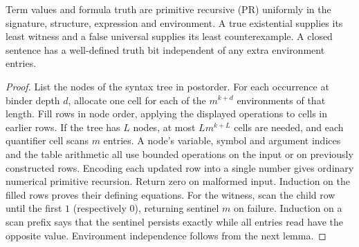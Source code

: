 \begin{proposition}\label{prop:mc}
Term values and formula truth are primitive recursive (PR) uniformly in the signature, structure, expression and environment. A true existential supplies its least witness and a false universal supplies its least counterexample. A closed sentence has a well-defined truth bit independent of any extra environment entries.
\end{proposition}
\begin{proof}
List the nodes of the syntax tree in postorder. For each occurrence at binder depth $d$, allocate one cell for each of the $m^{k+d}$ environments of that length. Fill rows in node order, applying the displayed operations to cells in earlier rows. If the tree has $L$ nodes, at most $L m^{k+L}$ cells are needed, and each quantifier cell scans $m$ entries. A node's variable, symbol and argument indices and the table arithmetic all use bounded operations on the input or on previously constructed rows. Encoding each updated row into a single number gives ordinary numerical primitive recursion. Return zero on malformed input. Induction on the filled rows proves their defining equations. For the witness, scan the child row until the first $1$ (respectively $0$), returning sentinel $m$ on failure. Induction on a scan prefix says that the sentinel persists exactly while all entries read have the opposite value. Environment independence follows from the next lemma.
\end{proof}

